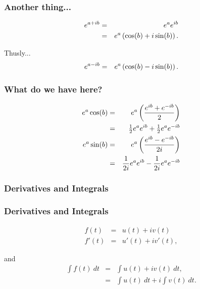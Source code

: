 \begin{frame}
  \frametitle{Another thing...}

  \begin{eqnarray*}
    e^{a+ib} & = & e^a e^{ib} \\
    & = & e^a \left( \cos(b) + i \sin(b) \right).
  \end{eqnarray*}

  Thusly...
  \begin{eqnarray*}
    e^{a-ib} & = & e^a \left( \cos(b) - i \sin(b) \right).
  \end{eqnarray*}

\end{frame}


\begin{frame}
  \frametitle{What do we have here?}

  \begin{eqnarray*}
    e^a \cos(b) & = & e^a \left( \frac{e^{ib}+e^{-ib}}{2} \right) \\
    & = & \mbox{$\frac{1}{2}$} e^a e^{ib} +\mbox{$\frac{1}{2}$} e^a  e^{-ib} \\
    e^a \sin(b) & = & e^a \left( \frac{e^{ib}-e^{-ib}}{2i} \right) \\
    & = & \frac{1}{2i} e^a e^{ib} - \frac{1}{2i} e^a e^{-ib}
  \end{eqnarray*}

\end{frame}

\subsubsection{Derivatives and Integrals}

\begin{frame}
  \frametitle{Derivatives and Integrals}

  \begin{eqnarray*}
    f(t) & = & u(t) + i v(t) \\
    f'(t) & = & u'(t) + i v'(t),
  \end{eqnarray*}

  and
  \begin{eqnarray*}
    \int f(t) ~ dt & = & \int u(t) + i v(t) ~ dt, \\
    & = & \int u(t) ~ dt + i \int v(t) ~ dt.
  \end{eqnarray*}

\end{frame}


